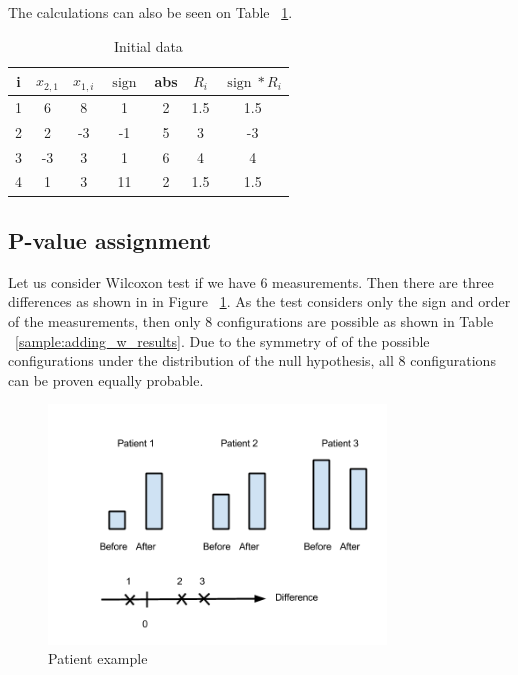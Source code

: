 \documentclass[12pt]{article}
\DeclareMathOperator{\sign}{sign}
\begin{document}
The calculations can also be seen on Table ~\ref{table:wilx_example}.

\begin{table}[h!]
  \begin{center}
    \begin{tabular}{ccccccc}
      \hline
      i & $x_{2, 1}$ & $x_{1, i}$ & $\sign$ & abs & $R_i$ & $\sign * R_i$\\
      \hline
      1 & 6 & 8 & 1 & 2 & 1.5 & 1.5 \\
      \hline
      2 & 2 & -3 & -1 & 5 & 3 & -3 \\
      \hline
      3 & -3 & 3 & 1 & 6 & 4 & 4 \\
      \hline
      4 & 1 & 3 & 11 & 2 & 1.5 & 1.5 \\
      \hline
    \end{tabular}
    \caption{Initial data}
    \label{table:wilx_example}
  \end{center}
\end{table}


\subsection{P-value assignment}
Let us consider Wilcoxon test if we have 6 measurements. Then there are three differences as shown in in Figure ~\ref{fig:patientExample}. As the test considers only the sign and order of the measurements, then only 8 configurations are possible as shown in Table ~\ref{sample:adding_w_results}. Due to the symmetry of of the possible configurations under the distribution of the null hypothesis, all 8 configurations can be proven equally probable.
\begin{figure}[h!]
  \centering
  \includegraphics[width=0.8\textwidth]{patientExample}
  \caption{Patient example}
  \label{fig:patientExample}
\end{figure}
\end{document}
